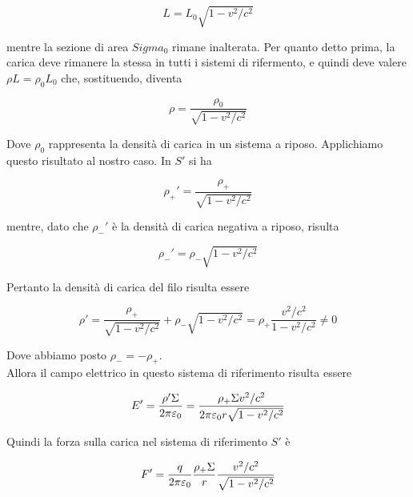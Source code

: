 \begin{equation}
    L = L_0 \sqrt{1 - v^2/c^2}
\end{equation}

mentre la sezione di area $Sigma_0$ rimane inalterata. Per quanto detto prima, la carica deve rimanere la stessa in tutti i sistemi di rifermento, e quindi deve valere $\rho L = \rho_0 L_0$ che, sostituendo, diventa

\begin{tcolorbox}[colback=yellow!10!white, colframe=orange!70!black, boxrule=0.8pt]
\begin{equation} 
    \rho = \frac{\rho_0}{\sqrt{1 - v^2/c^2}}
\end{equation}
\end{tcolorbox}

Dove $\rho_0$ rappresenta la densità di carica in un sistema a riposo. Applichiamo questo risultato al nostro caso. In $S'$ si ha 

\begin{equation}
    \rho_{+}' = \frac{\rho_{+}}{\sqrt{1 - v^2/c^2}}
\end{equation}

mentre, dato che $\rho_{-}'$ è la densità di carica negativa a riposo, risulta

\begin{equation}
    \rho_{-}' = \rho_{-} \sqrt{1 - v^2/c^2}
\end{equation}

Pertanto la densità di carica del filo risulta essere 

\begin{equation}
    \rho' = \frac{\rho_{+}}{\sqrt{1 - v^2/c^2}} + \rho_{-} \sqrt{1 - v^2/c^2} = \rho_{+} \frac{v^2/c^2}{1 - v^2/c^2} \neq 0
\end{equation}

Dove abbiamo posto $\rho_{-} = - \rho_{+}$. \\

Allora il campo elettrico in questo sistema di riferimento risulta essere

\begin{equation}
    E' = \frac{\rho' \Sigma}{2 \pi \varepsilon_0} = \frac{\rho_{+} \Sigma v^2/c^2}{2 \pi \varepsilon_0 r \sqrt{1 - v^2/c^2}}
\end{equation}

Quindi la forza sulla carica nel sistema di riferimento $S'$ è 

\begin{equation}
    F' = \frac{q}{2\pi \varepsilon_0} \frac{\rho_{+} \Sigma}{r} \frac{v^2/c^2}{\sqrt{1 - v^2/c^2}}
\end{equation}

